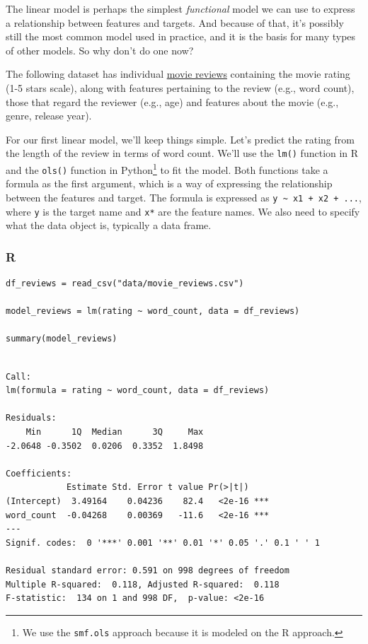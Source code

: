 \documentclass[
  letterpaper,
]{krantz}
\begin{document}
The linear model is perhaps the simplest \emph{functional} model we can
use to express a relationship between features and targets. And because
of that, it's possibly still the most common model used in practice, and
it is the basis for many types of other models. So why don't do one now?

The following dataset has individual
\hyperref[sec-dd-movie-reviews]{movie reviews} containing the movie
rating (1-5 stars scale), along with features pertaining to the review
(e.g., word count), those that regard the reviewer (e.g., age) and
features about the movie (e.g., genre, release year).

For our first linear model, we'll keep things simple. Let's predict the
rating from the length of the review in terms of word count. We'll use
the \texttt{lm()} function in R and the \texttt{ols()} function in
Python\footnote{We use the \texttt{smf.ols} approach because it is
  modeled on the R approach.} to fit the model. Both functions take a
formula as the first argument, which is a way of expressing the
relationship between the features and target. The formula is expressed
as \texttt{y\ \textasciitilde{}\ x1\ +\ x2\ +\ ...}, where \texttt{y} is
the target name and \texttt{x*} are the feature names. We also need to
specify what the data object is, typically a data frame.

\subsubsection{R}

\begin{verbatim}
df_reviews = read_csv("data/movie_reviews.csv")

model_reviews = lm(rating ~ word_count, data = df_reviews)

summary(model_reviews)
\end{verbatim}

\begin{verbatim}

Call:
lm(formula = rating ~ word_count, data = df_reviews)

Residuals:
    Min      1Q  Median      3Q     Max 
-2.0648 -0.3502  0.0206  0.3352  1.8498 

Coefficients:
            Estimate Std. Error t value Pr(>|t|)    
(Intercept)  3.49164    0.04236    82.4   <2e-16 ***
word_count  -0.04268    0.00369   -11.6   <2e-16 ***
---
Signif. codes:  0 '***' 0.001 '**' 0.01 '*' 0.05 '.' 0.1 ' ' 1

Residual standard error: 0.591 on 998 degrees of freedom
Multiple R-squared:  0.118, Adjusted R-squared:  0.118 
F-statistic:  134 on 1 and 998 DF,  p-value: <2e-16
\end{verbatim}
\end{document}
